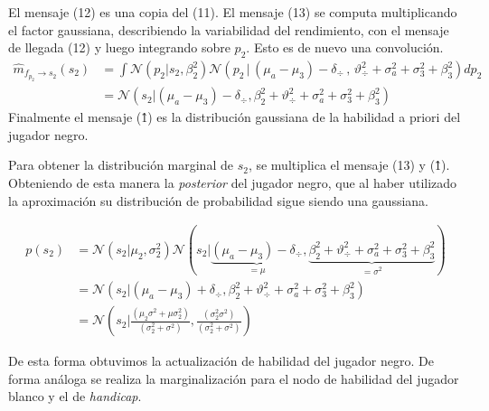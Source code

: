 \documentclass[11pt,twoside,spanish]{report} %
\begin{document}
El mensaje (12) es una copia del (11).
El mensaje (13) se computa multiplicando el factor gaussiana, describiendo la variabilidad del rendimiento, con el mensaje de llegada (12) y luego integrando sobre $p_2$.
Esto es de nuevo una convoluci\'on.
\begin{equation}
\begin{split}
\widehat{m}_{f_{p_2} \rightarrow s_2}(s_2) &= \int  \mathcal{N}(p_2| s_2, \beta_2^2)  \mathcal{N}( p_2 \,|\,  (\mu_a - \mu_3) - \delta_{\div}  \,,\,\vartheta_{\div}^2 + \sigma_a^2 + \sigma_3^2 + \beta_3^2)  dp_2 \\
&=  \mathcal{N}( s_2|(\mu_a - \mu_3) - \delta_{\div}  ,\beta_2^2+ \vartheta_{\div}^2 + \sigma_a^2 + \sigma_3^2 + \beta_3^2)
\end{split}
\end{equation}
Finalmente el mensaje (\^{1}) es la distribuci\'on gaussiana de la habilidad a priori del jugador negro.

Para obtener la distribuci\'on marginal de $s_2$, se multiplica el mensaje (13) y (\^{1}).
Obteniendo de esta manera la \textit{posterior} del jugador negro, que al haber utilizado la aproximaci\'on su distribuci\'on de probabilidad sigue siendo una gaussiana.

\begin{equation}
\begin{split}
p(s_2) &= \mathcal{N}( s_2|\mu_2,\sigma_2^2)  \mathcal{N}( s_2| \underbrace{(\mu_a - \mu_3) - \delta_{\div}}_{=\mu}  , \underbrace{\beta_2^2+ \vartheta_{\div}^2 + \sigma_a^2 + \sigma_3^2 + \beta_3^2}_{=\sigma^2}) \\
&=  \mathcal{N}( s_2|(\mu_a - \mu_3) + \delta_{\div}  ,\beta_2^2+ \vartheta_{\div}^2 + \sigma_a^2 + \sigma_3^2 + \beta_3^2) \\
&=  \mathcal{N}\left(s_2|\frac{(\mu_2\sigma^2+\mu\sigma_2^2)}{(\sigma_2^2+\sigma^2)}, \frac{(\sigma_2^2\sigma^2)}{(\sigma_2^2+\sigma^2)}\right)
\end{split}
\end{equation}

De esta forma obtuvimos la actualizaci\'on de habilidad del jugador negro.
De forma an\'aloga se realiza la marginalizaci\'on para el nodo de habilidad del jugador blanco y el de \textit{handicap}.
\end{document}
